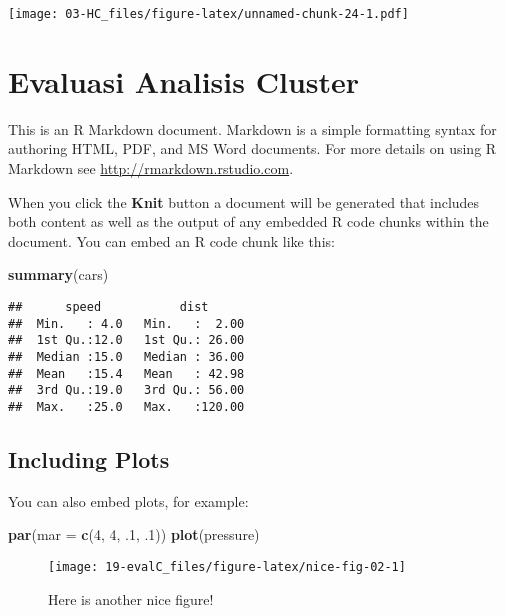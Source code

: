 \documentclass[
]{elegantbook}
\newenvironment{Shaded}{\begin{snugshade}}{\end{snugshade}}
\newcommand{\AttributeTok}[1]{\textcolor[rgb]{0.13,0.29,0.53}{#1}}
\newcommand{\DecValTok}[1]{\textcolor[rgb]{0.00,0.00,0.81}{#1}}
\newcommand{\FunctionTok}[1]{\textcolor[rgb]{0.13,0.29,0.53}{\textbf{#1}}}
\newcommand{\NormalTok}[1]{#1}
\begin{document}
\texttt{[image: 03-HC\_files/figure-latex/unnamed-chunk-24-1.pdf]}

\hypertarget{evaluasi-analisis-cluster}{%
\chapter{Evaluasi Analisis Cluster}\label{evaluasi-analisis-cluster}}

This is an R Markdown document. Markdown is a simple formatting syntax for authoring HTML, PDF, and MS Word documents. For more details on using R Markdown see \url{http://rmarkdown.rstudio.com}.

When you click the \textbf{Knit} button a document will be generated that includes both content as well as the output of any embedded R code chunks within the document. You can embed an R code chunk like this:

\begin{Shaded}
\begin{Highlighting}[]
\FunctionTok{summary}\NormalTok{(cars)}
\end{Highlighting}
\end{Shaded}

\begin{verbatim}
##      speed           dist       
##  Min.   : 4.0   Min.   :  2.00  
##  1st Qu.:12.0   1st Qu.: 26.00  
##  Median :15.0   Median : 36.00  
##  Mean   :15.4   Mean   : 42.98  
##  3rd Qu.:19.0   3rd Qu.: 56.00  
##  Max.   :25.0   Max.   :120.00
\end{verbatim}

\hypertarget{including-plots}{%
\section{Including Plots}\label{including-plots}}

You can also embed plots, for example:

\begin{Shaded}
\begin{Highlighting}[]
\FunctionTok{par}\NormalTok{(}\AttributeTok{mar =} \FunctionTok{c}\NormalTok{(}\DecValTok{4}\NormalTok{, }\DecValTok{4}\NormalTok{, .}\DecValTok{1}\NormalTok{, .}\DecValTok{1}\NormalTok{))}
\FunctionTok{plot}\NormalTok{(pressure)}
\end{Highlighting}
\end{Shaded}

\begin{figure}

{\centering \texttt{[image: 19-evalC\_files/figure-latex/nice-fig-02-1]} 

}

\caption{Here is another nice figure!}\label{fig:nice-fig-02}
\end{figure}
\end{document}
